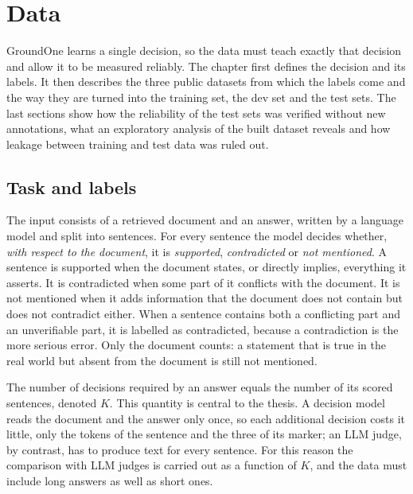 \chapter{Data}
\label{ch:data}

GroundOne learns a single decision, so the data must teach exactly that decision and allow it to be measured
reliably. The chapter first defines the decision and its labels. It then describes the three public datasets from which
the labels come and the way they are turned into the training set, the dev set and the test sets. The last sections
show how the reliability of the test sets was verified without new annotations, what an exploratory analysis of the
built dataset reveals and how leakage between training and test data was ruled out.


\section{Task and labels}
\label{sec:data-task}

The input consists of a retrieved document and an answer, written by a language model and split into sentences. For
every sentence the model decides whether, \emph{with respect to the document}, it is \emph{supported},
\emph{contradicted} or \emph{not mentioned}. A sentence is supported when the document states, or directly implies,
everything it asserts. It is contradicted when some part of it conflicts with the document. It is not mentioned when it
adds information that the document does not contain but does not contradict either. When a sentence contains both a
conflicting part and an unverifiable part, it is labelled as contradicted, because a contradiction is the more serious
error. Only the document counts: a statement that is true in the real world but absent from the document is still not
mentioned.

The number of decisions required by an answer equals the number of its scored sentences, denoted $K$. This quantity is
central to the thesis. A decision model reads the document and the answer only once, so each additional decision costs it little, only the tokens of the sentence and the three of its marker; an LLM judge, by contrast, has to produce text for every sentence. For this reason the
comparison with LLM judges is carried out as a function of $K$, and the data must include long answers as well
as short ones.

